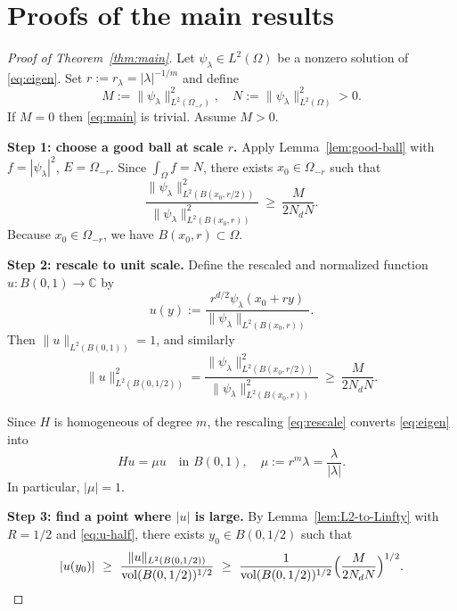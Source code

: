 \documentclass[12pt, reqno]{amsart}
\theoremstyle{plain}
\theoremstyle{remark}
\newcommand{\C}{\mathbb{C}}
\newcommand{\vol}{\operatorname{vol}}
\begin{document}
\section{Proofs of the main results}

\begin{proof}[Proof of Theorem~\ref{thm:main}]
Let $\psi_\lambda\in L^2(\Omega)$ be a nonzero solution of \eqref{eq:eigen}.
Set $r := r_\lambda = |\lambda|^{-1/m}$ and define
$$
M := \|\psi_\lambda\|_{L^2(\Omega_{-r})}^2,\quad
N := \|\psi_\lambda\|_{L^2(\Omega)}^2>0.
$$
If $M = 0$ then \eqref{eq:main} is trivial. Assume $M>0$.

\textbf{Step 1: choose a good ball at scale $r$.}
Apply Lemma~\ref{lem:good-ball} with $f = |\psi_\lambda|^2$, $E = \Omega_{-r}$.
Since $\int_\Omega f = N$, there exists $x_0\in\Omega_{-r}$ such that
\begin{equation}\label{eq:good-ratio}
\frac{\|\psi_\lambda\|_{L^2(B(x_0,r/2))}^2}{\|\psi_\lambda\|_{L^2(B(x_0,r))}^2}
\ \ge\ \frac{M}{2N_d N}.
\end{equation}
Because $x_0\in\Omega_{-r}$, we have $B(x_0,r)\subset\Omega$.

\textbf{Step 2: rescale to unit scale.}
Define the rescaled and normalized function $u:B(0,1)\to\C$ by
\begin{equation}\label{eq:rescale}
u(y) := \frac{r^{d/2} \psi_\lambda(x_0+r y)}{\|\psi_\lambda\|_{L^2(B(x_0,r))}}.
\end{equation}
Then $\|u\|_{L^2(B(0,1))} = 1$, and similarly
\begin{equation}\label{eq:u-half}
\|u\|_{L^2(B(0,1/2))}^2
 = \frac{\|\psi_\lambda\|_{L^2(B(x_0,r/2))}^2}{\|\psi_\lambda\|_{L^2(B(x_0,r))}^2}
\ \ge\ \frac{M}{2N_d N}.
\end{equation}

Since $H$ is homogeneous of degree $m$, the rescaling \eqref{eq:rescale} converts \eqref{eq:eigen} into
\begin{equation}\label{eq:scaled-eqn}
Hu = \mu u\quad\text{in }B(0,1),
\quad \mu := r^m\lambda = \frac{\lambda}{|\lambda|}.
\end{equation}
In particular, $|\mu| = 1$.

\textbf{Step 3: find a point where $|u|$ is large.}
By Lemma~\ref{lem:L2-to-Linfty} with $R = 1/2$ and \eqref{eq:u-half}, there exists $y_0\in B(0,1/2)$ such that
\begin{equation}\label{eq:amp-lower}
|u(y_0)|\ \ge\ \frac{\|u\|_{L^2(B(0,1/2))}}{\vol(B(0,1/2))^{1/2}}
\ \ge\ \frac{1}{\vol(B(0,1/2))^{1/2}}\Bigl(\frac{M}{2N_d N}\Bigr)^{1/2}.
\end{equation}


\end{proof}
\end{document}
